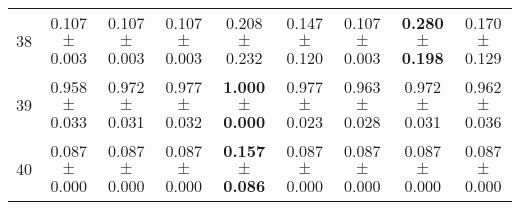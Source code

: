 \begin{table}[!ht]
{\begin{tabular}{r c c c c c c c c}
38 & 0.107 $\pm$ 0.003 & 0.107 $\pm$ 0.003 & 0.107 $\pm$ 0.003 & 0.208 $\pm$ 0.232 & 0.147 $\pm$ 0.120 & 0.107 $\pm$ 0.003 & \textbf{0.280 $\pm$ 0.198} & 0.170 $\pm$ 0.129 \\
39 & 0.958 $\pm$ 0.033 & 0.972 $\pm$ 0.031 & 0.977 $\pm$ 0.032 & \textbf{1.000 $\pm$ 0.000} & 0.977 $\pm$ 0.023 & 0.963 $\pm$ 0.028 & 0.972 $\pm$ 0.031 & 0.962 $\pm$ 0.036 \\
40 & 0.087 $\pm$ 0.000 & 0.087 $\pm$ 0.000 & 0.087 $\pm$ 0.000 & \textbf{0.157 $\pm$ 0.086} & 0.087 $\pm$ 0.000 & 0.087 $\pm$ 0.000 & 0.087 $\pm$ 0.000 & 0.087 $\pm$ 0.000 \\
\end{tabular}}
\end{table}

